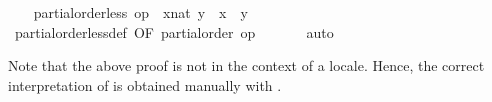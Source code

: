 \begin{isabellebody}
\begin{isamarkuptxt}
\end{isamarkuptxt}%
\isamarkuptrue%
\ \ \isamarkupfalse%
\ {\isachardoublequoteopen}partial{\isacharunderscore}order{\isachardot}less\ op\ {\isasymle}\ {\isacharparenleft}x{\isacharcolon}{\isacharcolon}nat{\isacharparenright}\ y\ {\isacharequal}\ {\isacharparenleft}x\ {\isacharless}\ y{\isacharparenright}{\isachardoublequoteclose}\isanewline
\ \ \ \ \isamarkupfalse%
\ partial{\isacharunderscore}order{\isachardot}less{\isacharunderscore}def\ {\isacharbrackleft}OF\ {\isacharbackquoteopen}partial{\isacharunderscore}order\ op\ {\isasymle}{\isacharbackquoteclose}{\isacharbrackright}\isanewline
\ \ \ \ \isamarkupfalse%
\ auto\isanewline
{}\isamarkupfalse%
%
\endisatagvisible
{\isafoldvisible}%
%
\isadelimvisible
%
\endisadelimvisible
%
\begin{isamarkuptext}%
Note that the above proof is not in the context of a locale.
  Hence, the correct interpretation of  is obtained manually with .%
\end{isamarkuptext}%
\isamarkuptrue%
%
\isadelimtheory
%
\endisadelimtheory
%
\isatagtheory
{}\isamarkupfalse%
%
\endisatagtheory
{\isafoldtheory}%
%
\isadelimtheory
%
\endisadelimtheory
\isanewline
\end{isabellebody}%
